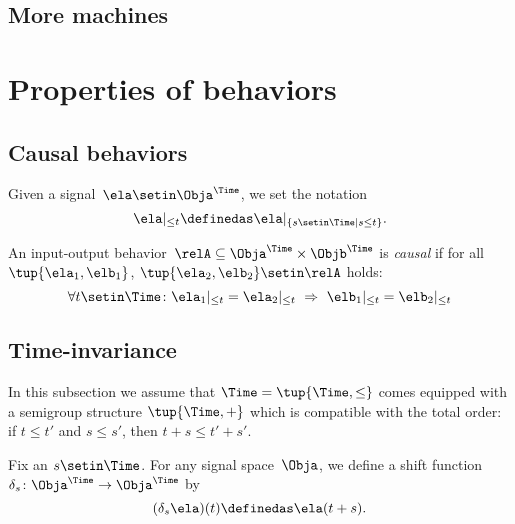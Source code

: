 {    \subsection{More machines}

    \section{Properties of behaviors}

    \subsection{Causal behaviors}

    Given a signal~$\ela \setin \Obja^\Time$, we set the notation
    \begin{equation}
        \ela \vert_{\leq t} \definedas  \ela \vert_{\{ s \setin \Time \mid s \leq t\}}.
    \end{equation}

    \begin{definition}
        An input-output behavior~$\relA \subseteq \Obja^\Time \times \Objb^\Time$ is \emph{causal} if for all~$\tup{\ela_1, \elb_1}$, $\tup{\ela_2, \elb_2} \setin \relA$ holds:
        \begin{equation*}
            \forall t \setin \Time\colon \ela_1 \vert_{ \leq t} = \ela_2 \vert_{ \leq t} \  \Rightarrow \ \elb_1 \vert_{ \leq t} = \elb_2 \vert_{ \leq t}
        \end{equation*}
    \end{definition}


    \subsection{Time-invariance}

    In this subsection we assume that $\Time = \tup{\Time, \leq}$ comes equipped with a semigroup structure $\tup{\Time, +}$ which is compatible with the total order: if $t \leq t'$ and $s \leq s'$, then $t + s \leq t' + s'$.

    Fix an $s \setin \Time$.
    For any signal space~$\Obja$, we define a shift function~$\delta_s\colon \Obja^\Time \to \Obja^\Time$ by
    \begin{equation*}
        (\delta_s \ela)(t) \definedas \ela(t + s).
    \end{equation*}

}
